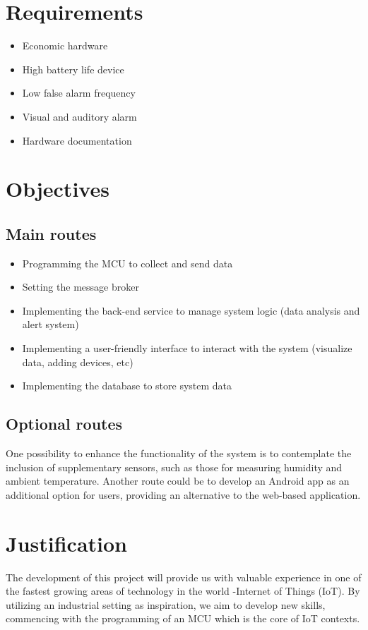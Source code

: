 \documentclass[a4paper,twoside,11pt]{article}
\begin{document}
\section{Requirements}
\begin{itemize}
    \item Economic hardware
    \item High battery life device
    \item Low false alarm frequency
    \item Visual and auditory alarm
    \item Hardware documentation
\end{itemize}
\section{Objectives}
\subsection{Main routes}
 \begin{itemize}
    \item Programming the MCU to collect and send data
    \item Setting the message broker
    \item Implementing the back-end service to manage system logic (data analysis and alert system)
    \item Implementing a user-friendly interface to interact with the system (visualize data, adding devices, etc)
    \item Implementing the database to store system data
\end{itemize}
\subsection{Optional routes}
    One possibility to enhance the functionality of the system is to contemplate the inclusion of supplementary sensors, such as those for measuring humidity and ambient temperature. Another route could be to develop an Android app as an additional option for users, providing an alternative to the web-based application.

\section{Justification}

The development of this project will provide us with valuable experience in one of the fastest growing areas of technology in the world -Internet of Things (IoT).
By utilizing an industrial setting as inspiration, we aim to develop new skills, commencing with the programming of an MCU which is the core of IoT contexts.
\end{document}
